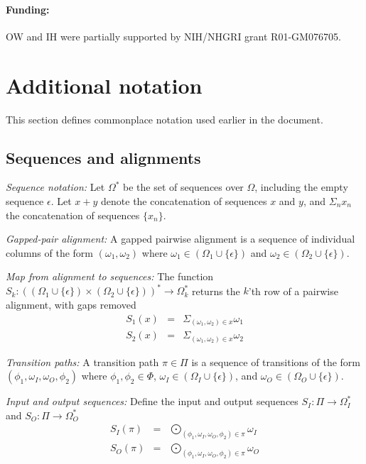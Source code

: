 \documentclass{article}
\newcommand\gappedalphabet[1]{(\Omega_{#1} \cup \{\epsilon\})}
\newcommand\gappedpair[2]{\gappedalphabet{#1} \times \gappedalphabet{#2}}
\newcommand\States{\Phi}
\begin{document}
\paragraph{Funding:} OW and IH were partially supported by NIH/NHGRI grant R01-GM076705.

\appendix
\section{Additional notation}
This section defines commonplace notation used earlier in the document.
\subsection{Sequences and alignments}
{\em Sequence notation:}
Let $\Omega^\ast$ be the set of sequences over $\Omega$, including the empty sequence $\epsilon$.
Let $x+y$ denote the concatenation of sequences $x$ and $y$, and $\Sigma_n x_n$ the concatenation of sequences $\{ x_n \}$.

{\em Gapped-pair alignment:}
A gapped pairwise alignment is a sequence of individual columns of the form $(\omega_1,\omega_2)$ where $\omega_1 \in \gappedalphabet{1}$ and $\omega_2 \in \gappedalphabet{2}$.

{\em Map from alignment to sequences:}
The function $S_k:\left(\gappedpair{1}{2}\right)^\ast \to \Omega_k^\ast$ returns the $k$'th row of a pairwise alignment, with gaps removed
\begin{eqnarray*}
S_1(x) & = & \Sigma_{(\omega_1,\omega_2) \in x} \omega_1 \\
S_2(x) & = & \Sigma_{(\omega_1,\omega_2) \in x} \omega_2
\end{eqnarray*}

{\em Transition paths:}
A transition path $\pi \in \Pi$ 
is a sequence of transitions of the form $(\phi_1,\omega_I,\omega_O,\phi_2)$
where
$\phi_1,\phi_2 \in \States$,
$\omega_I \in \gappedalphabet{I}$, and
$\omega_O \in \gappedalphabet{O}$.

{\em Input and output sequences:}
Define the input and output sequences
$S_I:\Pi \to \Omega_I^\ast$ and
$S_O:\Pi \to \Omega_O^\ast$
\begin{eqnarray*}
S_I(\pi) & = & \bigodot_{(\phi_1,\omega_I,\omega_O,\phi_2) \in \pi} \omega_I \\
S_O(\pi) & = & \bigodot_{(\phi_1,\omega_I,\omega_O,\phi_2) \in \pi} \omega_O
\end{eqnarray*}




\end{document}
